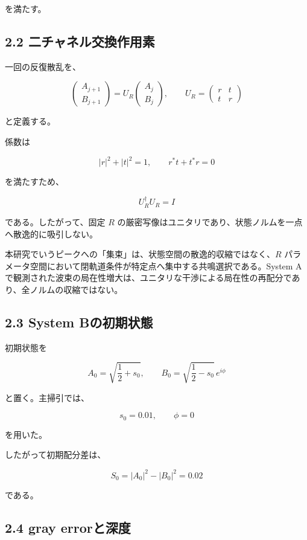 \documentclass[
  10pt,
  a4paper,
]{article}
\begin{document}
を満たす。

\subsection{2.2
二チャネル交換作用素}\label{ux4e8cux30c1ux30e3ux30cdux30ebux4ea4ux63dbux4f5cux7528ux7d20}

一回の反復散乱を、

\[
\boxed{
\begin{pmatrix}
A_{j+1}\\
B_{j+1}
\end{pmatrix}
=
U_R
\begin{pmatrix}
A_j\\
B_j
\end{pmatrix},
\qquad
U_R=
\begin{pmatrix}
r&t\\
t&r
\end{pmatrix}
}
\]

と定義する。

係数は

\[
|r|^2+|t|^2=1,
\qquad
r^*t+t^*r=0
\]

を満たすため、

\[
U_R^\dagger U_R=I
\]

である。したがって、固定 \(R\)
の厳密写像はユニタリであり、状態ノルムを一点へ散逸的に吸引しない。

本研究でいうピークへの「集束」は、状態空間の散逸的収縮ではなく、\(R\)
パラメータ空間において閉軌道条件が特定点へ集中する共鳴選択である。System
Aで観測された波束の局在性増大は、ユニタリな干渉による局在性の再配分であり、全ノルムの収縮ではない。

\subsection{2.3 System
Bの初期状態}\label{system-bux306eux521dux671fux72b6ux614b}

初期状態を

\[
A_0=\sqrt{\frac12+s_0},
\qquad
B_0=\sqrt{\frac12-s_0}\,e^{i\phi}
\]

と置く。主掃引では、

\[
s_0=0.01,\qquad \phi=0
\]

を用いた。

したがって初期配分差は、

\[
S_0=|A_0|^2-|B_0|^2=0.02
\]

である。

\subsection{2.4 gray errorと深度}\label{gray-errorux3068ux6df1ux5ea6}
\end{document}
